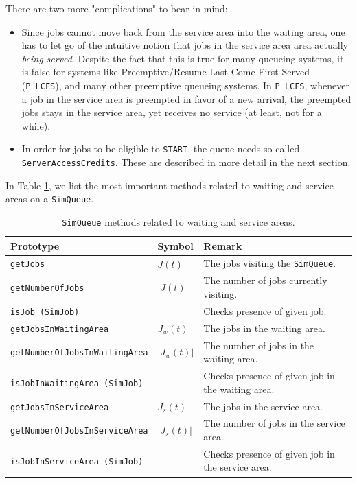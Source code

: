 \documentclass[12pt]{book}
\begin{document}
There are two more "complications" to bear in mind:
\begin{itemize}
  \item Since jobs cannot move back from the service area
          into the waiting area,
          one has to let go of the intuitive notion that
          jobs in the service area area actually {\em being served}.
        Despite the fact that this is true for many queueing systems,
          it is false for systems like Preemptive/Resume Last-Come First-Served
          (\lstinline|P_LCFS|),
          and many other preemptive queueing systems.
        In \lstinline|P_LCFS|, whenever a job in the service area is preempted
          in favor of a new arrival,
          the preempted jobs stays in the service area,
          yet receives no service (at least, not for a while).
  \item In order for jobs to be eligible to \lstinline|START|,
          the queue needs so-called \lstinline|ServerAccessCredits|.
        These are described in more detail in the next section.
\end{itemize}

In Table \ref{simqueue-methods-areas},
  we list the most important methods related to waiting and service areas
  on a \lstinline|SimQueue|.

\begin{table}[h]
\caption{\texttt{SimQueue} methods related to waiting and service areas.}
\label{simqueue-methods-areas}
\begin{center}
\begin{tabular}{|l|l|l|}
\hline
Prototype & Symbol & Remark \\ \hline
\lstinline|getJobs|                      & $J(t)$      & The jobs visiting the \lstinline|SimQueue|.       \\ \hline
\lstinline|getNumberOfJobs|              & $|J(t)|$    & The number of jobs currently visiting.            \\ \hline
\lstinline|isJob (SimJob)|               &             & Checks presence of given job.                     \\ \hline
\lstinline|getJobsInWaitingArea|         & $J_w(t)$    & The jobs in the waiting area.                     \\ \hline
\lstinline|getNumberOfJobsInWaitingArea| & $|J_w(t)|$  & The number of jobs in the waiting area.           \\ \hline
\lstinline|isJobInWaitingArea (SimJob)|  &             & Checks presence of given job in the waiting area. \\ \hline
\lstinline|getJobsInServiceArea|         & $J_s(t)$    & The jobs in the service area.                     \\ \hline
\lstinline|getNumberOfJobsInServiceArea| & $|J_s(t)|$  & The number of jobs in the service area.           \\ \hline
\lstinline|isJobInServiceArea (SimJob)|  &             & Checks presence of given job in the service area. \\ \hline
\end{tabular}
\end{center}
\end{table}
\end{document}
